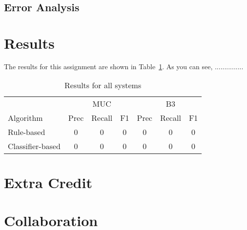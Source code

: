 \documentclass[12pt, twocolumn]{article}
\begin{document}
\subsection{Error Analysis}

\section{Results}
The results for this assignment are shown in Table~\ref{tab:results}. As you can see, ...............
\begin{table}[b]
\begin{minipage}{\textwidth}
\centering
\begin{tabular}{l|c c c|c c c}
\hline
& & MUC & & & B3 & \\
Algorithm & Prec & Recall & F1 & Prec & Recall & F1 \\\hline
Rule-based & 0 & 0 & 0 & 0 & 0 & 0\\\hline  
Classifier-based & 0 & 0 & 0 & 0 & 0 & 0\\\hline
\end{tabular}
\caption{Results for all systems}\label{tab:results}
\end{minipage}
\end{table}


\section{Extra Credit}

\section{Collaboration} 
\end{document}
